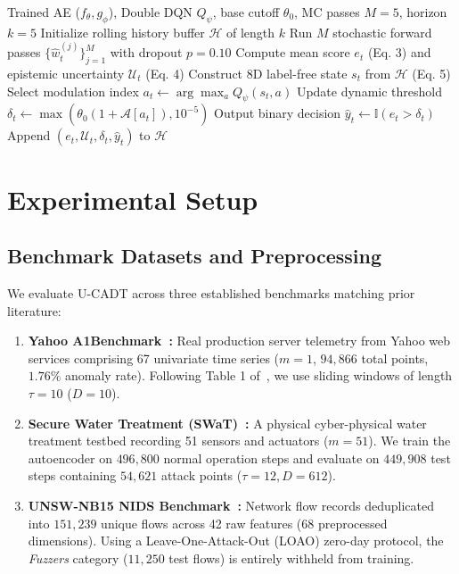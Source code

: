 \documentclass[conference]{IEEEtran}
\begin{document}
\begin{algorithm}[t]
\caption{U-CADT Autonomous Online Inference}
\label{alg:ucadt}
\begin{algorithmic}[1]
\REQUIRE Trained AE ($f_\theta, g_\phi$), Double DQN $Q_\psi$, base cutoff $\theta_0$, MC passes $M=5$, horizon $k=5$
\STATE Initialize rolling history buffer $\mathcal{H}$ of length $k$
    \STATE Run $M$ stochastic forward passes $\{\hat{w}_t^{(j)}\}_{j=1}^M$ with dropout $p=0.10$
    \STATE Compute mean score $e_t$ (Eq. 3) and epistemic uncertainty $\mathcal{U}_t$ (Eq. 4)
    \STATE Construct 8D label-free state $s_t$ from $\mathcal{H}$ (Eq. 5)
    \STATE Select modulation index $a_t \leftarrow \arg\max_a Q_\psi(s_t, a)$
    \STATE Update dynamic threshold $\delta_t \leftarrow \max(\theta_0(1 + \mathcal{A}[a_t]), 10^{-5})$
    \STATE Output binary decision $\hat{y}_t \leftarrow \mathbb{I}(e_t > \delta_t)$
    \STATE Append $(e_t, \mathcal{U}_t, \delta_t, \hat{y}_t)$ to $\mathcal{H}$ 
\ENDFOR
\end{algorithmic}
\end{algorithm}

\section{Experimental Setup}

\subsection{Benchmark Datasets and Preprocessing}
We evaluate U-CADT across three established benchmarks matching prior literature:
\begin{enumerate}
    \item \textbf{Yahoo A1Benchmark~\cite{laptev2015generic}:} Real production server telemetry from Yahoo web services comprising 67 univariate time series ($m=1$, $94,866$ total points, $1.76\%$ anomaly rate). Following Table 1 of~\cite{yang2023adt}, we use sliding windows of length $\tau=10$ ($D=10$).
    \item \textbf{Secure Water Treatment (SWaT)~\cite{mathur2016swat,goh2017dataset}:} A physical cyber-physical water treatment testbed recording 51 sensors and actuators ($m=51$). We train the autoencoder on $496,800$ normal operation steps and evaluate on $449,908$ test steps containing $54,621$ attack points ($\tau=12, D=612$).
    \item \textbf{UNSW-NB15 NIDS Benchmark~\cite{moustafa2015unsw}:} Network flow records deduplicated into $151,239$ unique flows across 42 raw features ($68$ preprocessed dimensions). Using a Leave-One-Attack-Out (LOAO) zero-day protocol, the \textit{Fuzzers} category ($11,250$ test flows) is entirely withheld from training.
\end{enumerate}
\end{document}
